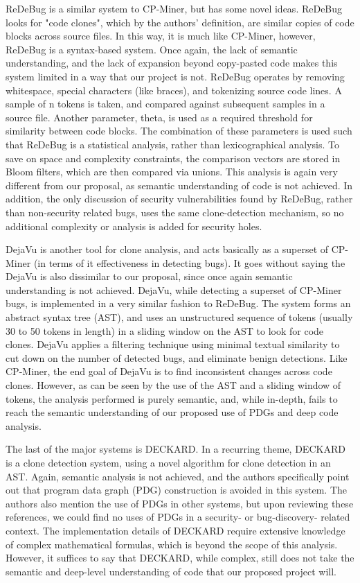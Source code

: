\documentclass{acm_proc_article-sp}
\begin{document}
ReDeBug is a similar system to CP-Miner, but has some novel ideas. ReDeBug 
looks for "code clones", which by the authors' definition, are similar copies 
of code blocks across source files. In this way, it is much like CP-Miner, 
however, ReDeBug is a syntax-based system. Once again, the lack of semantic 
understanding, and the lack of expansion beyond copy-pasted code makes this 
system limited in a way that our project is not. ReDeBug operates by removing 
whitespace, special characters (like braces), and tokenizing source code lines. 
A sample of n tokens is taken, and compared against subsequent samples in a 
source file. Another parameter, theta, is used as a required threshold for 
similarity between code blocks. The combination of these parameters is used 
such that ReDeBug is a statistical analysis, rather than lexicographical 
analysis. To save on space and complexity constraints, the comparison vectors 
are stored in Bloom filters, which are then compared via unions. This analysis 
is again very different from our proposal, as semantic understanding of code is 
not achieved. In addition, the only discussion of security vulnerabilities 
found by ReDeBug, rather than non-security related bugs, uses the same 
clone-detection mechanism, so no additional complexity or analysis is added for 
security holes.

DejaVu is another tool for clone analysis, and acts basically as a superset of 
CP-Miner (in terms of it effectiveness in detecting bugs). It goes without 
saying the DejaVu is also dissimilar to our proposal, since once again semantic 
understanding is not achieved. DejaVu, while detecting a superset of CP-Miner 
bugs, is implemented in a very similar fashion to ReDeBug. The system forms an 
abstract syntax tree (AST), and uses an unstructured sequence of tokens 
(usually 30 to 50 tokens in length) in a sliding window on the AST to look for 
code clones. DejaVu applies a filtering technique using minimal textual 
similarity to cut down on the number of detected bugs, and eliminate benign 
detections. Like CP-Miner, the end goal of DejaVu is to find inconsistent 
changes across code clones. However, as can be seen by the use of the AST and a 
sliding window of tokens, the analysis performed is purely semantic, and, while 
in-depth, fails to reach the semantic understanding of our proposed use of PDGs 
and deep code analysis.

The last of the major systems is DECKARD. In a recurring theme, DECKARD is a 
clone detection system, using a novel algorithm for clone detection in an AST. 
Again, semantic analysis is not achieved, and the authors specifically point 
out that program data graph (PDG) construction is avoided in this system. The 
authors also mention the use of PDGs in other systems, but upon reviewing these 
references, we could find no uses of PDGs in a security- or bug-discovery-
related context. The implementation details of DECKARD require extensive 
knowledge of complex mathematical formulas, which is beyond the scope of this 
analysis. However, it suffices to say that DECKARD, while complex, still does 
not take the semantic and deep-level understanding of code that our proposed 
project will.
\end{document}
